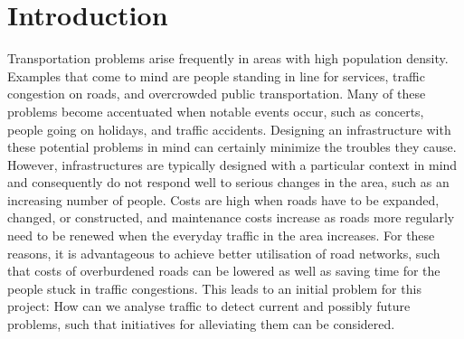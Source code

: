 \chapter{Introduction}
Transportation problems arise frequently in areas with high population density. Examples that come to mind are people standing in line for services, traffic congestion on roads, and overcrowded public transportation. Many of these problems become accentuated when notable events occur, such as concerts, people going on holidays, and traffic accidents. Designing an infrastructure with these potential problems in mind can certainly minimize the troubles they cause. However, infrastructures are typically designed with a particular context in mind and consequently do not respond well to serious changes in the area, such as an increasing number of people. Costs are high when roads have to be expanded, changed, or constructed, and maintenance costs increase as roads more regularly need to be renewed when the everyday traffic in the area increases. For these reasons, it is advantageous to achieve better utilisation of road networks, such that costs of overburdened roads can be lowered as well as saving time for the people stuck in traffic congestions. This leads to an initial problem for this project: How can we analyse traffic to detect current and possibly future problems, such that initiatives for alleviating them can be considered.
